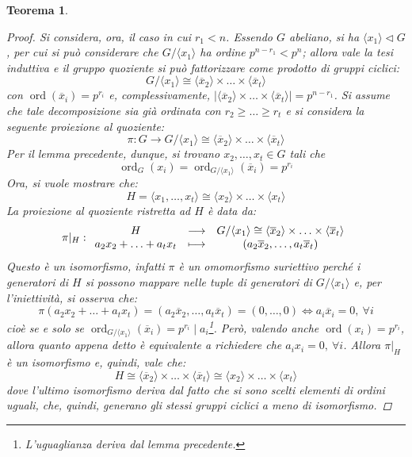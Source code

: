 \documentclass[12pt]{scrartcl}
\theoremstyle{style}
\newtheorem{teorema}{Teorema}[section]
\numberwithin{equation}{subsection}
\begin{document}
\begin{teorema}
\begin{proof}
		Si considera, ora, il caso in cui $r_1<n$.
		Essendo $G$ abeliano, si ha $\langle x_1 \rangle \lhd G$, per cui si pu\`o considerare che $G / \langle x_1 \rangle$ ha ordine $p^{n-r_1} < p^n$; allora vale la tesi induttiva e il gruppo quoziente si pu\`o fattorizzare come prodotto di gruppi ciclici:
		\[
		G / \langle x_1 \rangle \cong \langle \overline{x}_2 \rangle\times \ldots\times \langle \overline{x}_t \rangle
		\] 
		con $\operatorname{ord}(\overline{x}_i) = p^{r_i} $ e, complessivamente, $\lvert \langle \overline{x}_2 \rangle\times \ldots\times \langle \overline{x}_t \rangle \rvert=p^{n-r_1}  $.
		Si assume che tale decomposizione sia gi\`a ordinata con $r_2\ge \ldots\ge r_t$ e si considera la seguente proiezione al quoziente:
		\[
		\pi : G \to G / \langle x_1 \rangle \cong \langle \overline{x}_2 \rangle\times \ldots\times \langle \overline{x}_t \rangle
		\] 
		Per il lemma precedente, dunque, si trovano $x_2,\ldots,x_t \in G$ tali che 
		\[
		\operatorname{ord}_G(x_i) =\operatorname{ord}_{G/\langle x_1 \rangle} (\overline{x}_i) = p^{r_i} 
		\] 
		Ora, si vuole mostrare che:
\[
H = \langle x_1,\ldots,x_t \rangle\cong \langle x_2 \rangle\times \ldots\times \langle x_t \rangle
\] 
La proiezione al quoziente ristretta ad $H$ \`e data da:
\[
\pi|_{H}  : 
	\begin{array}
		{c c c}
		H &\longrightarrow& G / \langle x_1 \rangle\cong \langle \overline{x}_2 \rangle\times \ldots\times \langle \overline{x}_t \rangle\\
		a_2x_2+\ldots+a_tx_t&\longmapsto& (a_2\overline{x}_2,\ldots,a_t \overline{x}_t)
	\end{array}
\] 
Questo \`e un isomorfismo, infatti $\pi$ \`e un omomorfismo suriettivo perch\'e i generatori di $H$ si possono mappare nelle tuple  di generatori di $G / \langle x_1 \rangle$ e, per l'iniettivit\`a, si osserva che:
\[
\pi(a_2x_2+ \ldots+a_t x_t) = (a_2\overline{x}_2,\ldots,a_t \overline{x}_t)= (0,\ldots,0) \iff a_i \overline{x}_i = 0, \ \forall i
\] 
cio\`e se e solo se $\operatorname{ord}_{G/\langle x_1 \rangle} (\overline{x}_i) = p^{r_i}  \mid a_i $\footnote{L'uguaglianza deriva dal lemma precedente.}.
Per\`o, valendo anche $\operatorname{ord}(x_i) =p^{r_i} $, allora quanto appena detto \`e equivalente a richiedere che $a_i x_ i= 0 , \ \forall i$.
Allora $\pi|_{H} $ \`e un isomorfismo e, quindi, vale che:
\[
H \cong \langle \overline{x}_2 \rangle\times \ldots \times \langle \overline{x}_t \rangle \cong \langle x_2 \rangle\times \ldots\times \langle x_t \rangle
\] 
dove l'ultimo isomorfismo deriva dal fatto che si sono scelti elementi di ordini uguali, che, quindi, generano gli stessi gruppi ciclici a meno di isomorfismo.


\end{proof}
\end{teorema}
\end{document}
